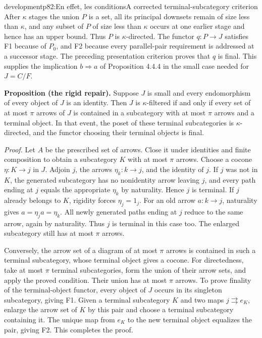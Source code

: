 \begin{dcomment}{development}{p82:En effet, les conditions}{A corrected terminal-subcategory criterion}
After $\kappa$ stages the union $P$ is a set, all its principal downsets remain of size less than $\kappa$, and any subset of $P$ of size less than $\kappa$ occurs at one earlier stage and hence has an upper bound.  Thus $P$ is $\kappa$-directed.  The functor $q:P\to J$ satisfies F1 because of $P_0$, and F2 because every parallel-pair requirement is addressed at a successor stage.  The preceding presentation criterion proves that $q$ is final.  This supplies the implication $b\Rightarrow a$ of Proposition 4.4.4 in the small case needed for $J=C/F$.

\textbf{Proposition (the rigid repair).}\ours{}\quad
Suppose $J$ is small and every endomorphism of every object of $J$ is an identity.  Then $J$ is $\kappa$-filtered if and only if every set of at most $\pi$ arrows of $J$ is contained in a subcategory with at most $\pi$ arrows and a terminal object.  In that event, the poset of these terminal subcategories is $\kappa$-directed, and the functor choosing their terminal objects is final.

\emph{Proof.} Let $A$ be the prescribed set of arrows.  Close it under identities and finite composition to obtain a subcategory $K$ with at most $\pi$ arrows.  Choose a cocone $\eta:K\to j$ in $J$.  Adjoin $j$, the arrows $\eta_k:k\to j$, and the identity of $j$.  If $j$ was not in $K$, the generated subcategory has no nonidentity arrow leaving $j$, and every path ending at $j$ equals the appropriate $\eta_k$ by naturality.  Hence $j$ is terminal.  If $j$ already belongs to $K$, rigidity forces $\eta_j=1_j$.  For an old arrow $a:k\to j$, naturality gives $a=\eta_j a=\eta_k$.  All newly generated paths ending at $j$ reduce to the same arrow, again by naturality.  Thus $j$ is terminal in this case too.  The enlarged subcategory still has at most $\pi$ arrows.

Conversely, the arrow set of a diagram of at most $\pi$ arrows is contained in such a terminal subcategory, whose terminal object gives a cocone.  For directedness, take at most $\pi$ terminal subcategories, form the union of their arrow sets, and apply the proved condition.  Their union has at most $\pi$ arrows.  To prove finality of the terminal-object functor, every object of $J$ occurs in its singleton subcategory, giving F1.  Given a terminal subcategory $K$ and two maps $j\rightrightarrows e_K$, enlarge the arrow set of $K$ by this pair and choose a terminal subcategory containing it.  The unique map from $e_K$ to the new terminal object equalizes the pair, giving F2.  This completes the proof.


\end{dcomment}
